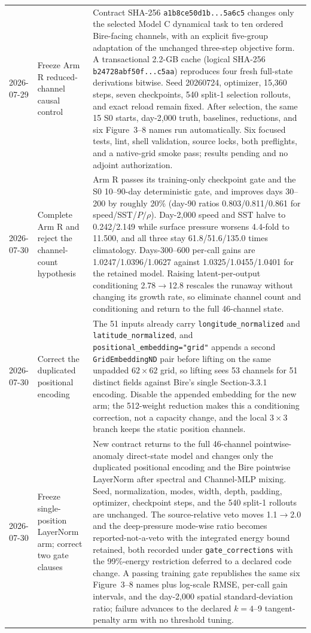 \documentclass[11pt]{article}
\begin{document}
\begin{longtable}{@{}p{}p{}p{}@{}}
2026-07-29 & Freeze Arm R reduced-channel causal control & Contract SHA-256 \texttt{a1b8ce50d1b...5a6c5} changes only the selected Model C dynamical task to ten ordered Bire-facing channels, with an explicit five-group adaptation of the unchanged three-step objective form.  A transactional 2.2-GB cache (logical SHA-256 \texttt{b24728abf50f...c5aa}) reproduces four fresh full-state derivations bitwise.  Seed 20260724, optimizer, 15,360 steps, seven checkpoints, 540 split-1 selection rollouts, and exact reload remain fixed.  After selection, the same 15 S0 starts, day-2,000 truth, baselines, reductions, and six Figure~3--8 names run automatically.  Six focused tests, lint, shell validation, source locks, both preflights, and a native-grid smoke pass; results pending and no adjoint authorization. \\
2026-07-30 & Complete Arm R and reject the channel-count hypothesis & Arm R passes its training-only checkpoint gate and the S0 10--90-day deterministic gate, and improves days 30--200 by roughly 20\% (day-90 ratios 0.803/0.811/0.861 for speed/SST/\(P/\rho\)).  Day-2,000 speed and SST halve to 0.242/2.149 while surface pressure worsens 4.4-fold to 11.500, and all three stay 61.8/51.6/135.0 times climatology.  Days-300--600 per-call gains are 1.0247/1.0396/1.0627 against 1.0325/1.0455/1.0401 for the retained model.  Raising latent-per-output conditioning 2.78\(\rightarrow\)12.8 rescales the runaway without changing its growth rate, so eliminate channel count and conditioning and return to the full 46-channel state. \\
2026-07-30 & Correct the duplicated positional encoding & The 51 inputs already carry \texttt{longitude\_normalized} and \texttt{latitude\_normalized}, and \texttt{positional\_embedding="grid"} appends a second \texttt{GridEmbeddingND} pair before lifting on the same unpadded \(62\times62\) grid, so lifting sees 53 channels for 51 distinct fields against Bire's single Section-3.3.1 encoding.  Disable the appended embedding for the new arm; the 512-weight reduction makes this a conditioning correction, not a capacity change, and the local \(3\times3\) branch keeps the static position channels. \\
2026-07-30 & Freeze single-position LayerNorm arm; correct two gate clauses & New contract returns to the full 46-channel pointwise-anomaly direct-state model and changes only the duplicated positional encoding and the Bire pointwise LayerNorm after spectral and Channel-MLP mixing.  Seed, normalization, modes, width, depth, padding, optimizer, checkpoint steps, and the 540 split-1 rollouts are unchanged.  The source-relative veto moves 1.1\(\rightarrow\)2.0 and the deep-pressure mode-wise ratio becomes reported-not-a-veto with the integrated energy bound retained, both recorded under \texttt{gate\_corrections} with the 99\%-energy restriction deferred to a declared code change.  A passing training gate republishes the same six Figure~3--8 names plus log-scale RMSE, per-call gain intervals, and the day-2,000 spatial standard-deviation ratio; failure advances to the declared \(k=4\)--9 tangent-penalty arm with no threshold tuning. \\

\end{longtable}
\end{document}
